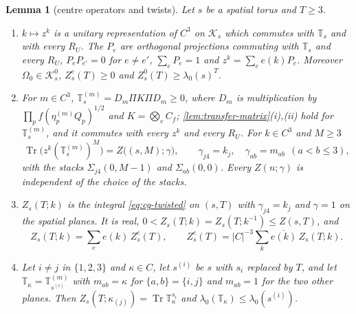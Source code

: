 \documentclass[11pt,a4paper]{amsart}
\newtheorem{lemma}[theorem]{Lemma}
\theoremstyle{definition}
\theoremstyle{remark}
\numberwithin{equation}{section}
\DeclareMathOperator{\Tr}{Tr}        %
\newcommand{\Kspace}{\mathcal{K}}    %
\newcommand{\abs}[1]{\lvert #1\rvert}      %
\newcommand{\TT}{\mathbb{T}}               %
\newcommand{\Zpart}[2]{Z(#1,#2)}           %
\newcommand{\lzero}{\lambda_0}             %
\newcommand{\Omegazero}{\Omega_0}          %
\begin{document}
\begin{lemma}[centre operators and twists]\label{lem:centre-operators}
Let $s$ be a spatial torus and $T\ge3$.
\begin{enumerate}[label=\textup{(\alph*)},leftmargin=*]
\item $k\mapsto z^k$ is a unitary representation of $C^3$ on $\Kspace_s$ which commutes with $\TT_s$ and with every $R_U$. The $P_e$ are orthogonal projections commuting with $\TT_s$ and every $R_U$, $P_eP_{e'}=0$ for $e\ne e'$, $\sum_eP_e=1$ and $z^k=\sum_ee(k)P_e$. Moreover $\Omegazero\in\Kspace^0_s$, $Z^e_s(T)\ge0$ and $Z^0_s(T)\ge\lzero(s)^T$.
\item For $m\in C^3$, $\TT^{(m)}_s=D_m\Pi K\Pi D_m\ge0$, where $D_m$ is multiplication by $\prod_pf(\eta^{(m)}_pQ_p)^{1/2}$ and $K=\bigotimes_eC_f$; \cref{lem:transfer-matrix}\textup{(i),(ii)} hold for $\TT^{(m)}_s$, and it commutes with every $z^k$ and every $R_U$. For $k\in C^3$ and $M\ge3$
\begin{equation}\label{eq:cg-trace}
\Tr\bigl(z^k(\TT^{(m)}_s)^M\bigr)=Z\bigl((s,M);\gamma\bigr),\qquad \gamma_{j4}=k_j,\quad\gamma_{ab}=m_{ab}\ \ (a<b\le3),
\end{equation}
with the stacks $\Sigma_{j4}(0,M-1)$ and $\Sigma_{ab}(0,0)$. Every $Z(n;\gamma)$ is independent of the choice of the stacks.
\item $Z_s(T;k)$ is the integral \eqref{eq:cg-twisted} on $(s,T)$ with $\gamma_{j4}=k_j$ and $\gamma=1$ on the spatial planes. It is real, $0<Z_s(T;k)=Z_s(T;k^{-1})\le\Zpart{s}{T}$, and
\begin{equation}\label{eq:cg-duality}
Z_s(T;k)=\sum_ee(k)\,Z^e_s(T),\qquad Z^e_s(T)=\abs{C}^{-3}\sum_k\overline{e(k)}\,Z_s(T;k).
\end{equation}
\item Let $i\ne j$ in $\{1,2,3\}$ and $\kappa\in C$, let $s^{(i)}$ be $s$ with $s_i$ replaced by $T$, and let $\TT_\kappa=\TT^{(m)}_{s^{(i)}}$ with $m_{ab}=\kappa$ for $\{a,b\}=\{i,j\}$ and $m_{ab}=1$ for the two other planes. Then $Z_s(T;\kappa_{(j)})=\Tr\TT_\kappa^{s_i}$ and $\lzero(\TT_\kappa)\le\lzero(s^{(i)})$.
\end{enumerate}
\end{lemma}
\end{document}
